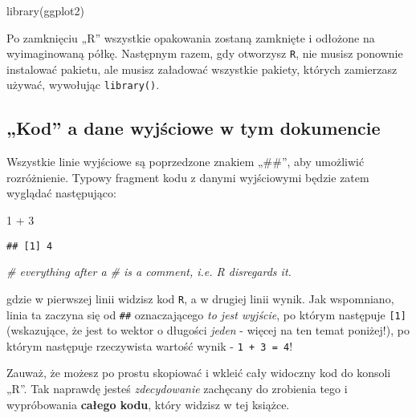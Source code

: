 \documentclass[
]{article}
\newenvironment{Shaded}{\begin{snugshade}}{\end{snugshade}}
\newcommand{\CommentTok}[1]{\textcolor[rgb]{0.56,0.35,0.01}{\textit{#1}}}
\newcommand{\DecValTok}[1]{\textcolor[rgb]{0.00,0.00,0.81}{#1}}
\newcommand{\FunctionTok}[1]{\textcolor[rgb]{0.00,0.00,0.00}{#1}}
\newcommand{\NormalTok}[1]{#1}
\newcommand{\SpecialCharTok}[1]{\textcolor[rgb]{0.00,0.00,0.00}{#1}}
\begin{document}
\begin{Shaded}
\begin{Highlighting}[]
\FunctionTok{library}\NormalTok{(ggplot2)}
\end{Highlighting}
\end{Shaded}

Po zamknięciu „R'' wszystkie opakowania zostaną zamknięte i odłożone na
wyimaginowaną półkę. Następnym razem, gdy otworzysz \texttt{R}, nie
musisz ponownie instalować pakietu, ale musisz załadować wszystkie
pakiety, których zamierzasz używać, wywołując \texttt{library()}.

\hypertarget{code-output}{%
\subsection{„Kod'' a dane wyjściowe w tym
dokumencie}\label{code-output}}

Wszystkie linie wyjściowe są poprzedzone znakiem „\#\#'', aby umożliwić
rozróżnienie. Typowy fragment kodu z danymi wyjściowymi będzie zatem
wyglądać następująco:

\begin{Shaded}
\begin{Highlighting}[]
\DecValTok{1} \SpecialCharTok{+} \DecValTok{3}
\end{Highlighting}
\end{Shaded}

\begin{verbatim}
## [1] 4
\end{verbatim}

\begin{Shaded}
\begin{Highlighting}[]
\CommentTok{\# everything after a \# is a comment, i.e. R disregards it.}
\end{Highlighting}
\end{Shaded}

gdzie w pierwszej linii widzisz kod \texttt{R}, a w drugiej linii wynik.
Jak wspomniano, linia ta zaczyna się od \texttt{\#\#} oznaczającego
\emph{to jest wyjście}, po którym następuje \texttt{{[}1{]}}
(wskazujące, że jest to wektor o długości \emph{jeden} - więcej na ten
temat poniżej!), po którym następuje rzeczywista wartość wynik -
\texttt{1\ +\ 3\ =\ 4}!

Zauważ, że możesz po prostu skopiować i wkleić cały widoczny kod do
konsoli „R''. Tak naprawdę jesteś \emph{zdecydowanie} zachęcany do
zrobienia tego i wypróbowania \textbf{całego kodu}, który widzisz w tej
książce.
\end{document}
